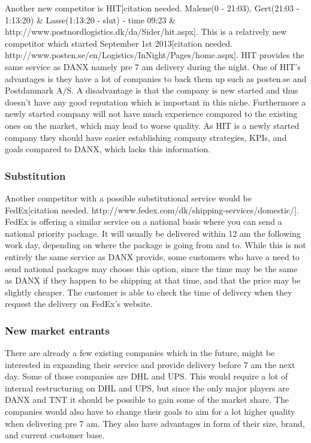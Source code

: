 Another new competitor is HIT[citation needed. Malene(0 - 21:03), Gert(21:03 - 1:13:20) \& Lasse(1:13:20 - slut) - time 09:23 \& http://www.postnordlogistics.dk/da/Sider/hit.aspx]. This is a relatively new competitor which started September 1st 2013[citation needed. http://www.posten.se/en/Logistics/InNight/Pages/home.aspx]. HIT provides the same service as DANX namely pre 7 am delivery during the night. 
One of HIT’s advantages is they have a lot of companies to back them up such as posten.se and Postdanmark A/S. A disadvantage is that the company is new started and thus doesn’t have any good reputation which is important in this niche. Furthermore a newly started company will not have much experience compared to the existing ones on the market, which may lead to worse quality.
As HIT is a newly started company they should have easier establishing company strategies, KPIs, and goals compared to DANX, which lacks this information.  

\subsubsection{Substitution}
Another competitor with a possible substitutional service would be FedEx[citation needed. http://www.fedex.com/dk/shipping-services/domestic/]. FedEx is offering a similar service on a national basis where you can send a national priority package. It will usually be delivered within 12 am the following work day, depending on where the package is going from and to. While this is not entirely the same service as DANX provide, some customers who have a need to send national packages may choose this option, since the time may be the same as DANX if they happen to be shipping at that time, and that the price may be slightly cheaper. The customer is able to check the time of delivery when they request the delivery on FedEx’s website. \\

\subsubsection{New market entrants}
There are already a few existing companies which in the future, might be interested in expanding their service and provide delivery before 7 am the next day. Some of those companies are DHL and UPS.
This would require a lot of internal restructuring on DHL and UPS, but since the only major players are DANX and TNT it should be possible to gain some of the market share. The companies would also have to change their goals to aim for a lot higher quality when delivering pre 7 am. They also have advantages in form of their size, brand, and current customer base.\\


